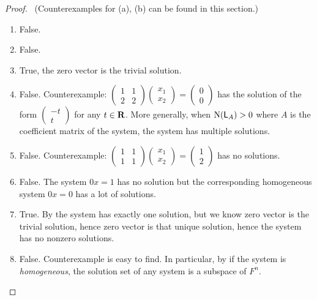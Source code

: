 \begin{proof} \ 
(Counterexamples for (a), (b) can be found in this section.)
\begin{enumerate}
\item False.
\item False.
\item True, the zero vector is the trivial solution.
\item False. Counterexample: \(\begin{pmatrix} 1 & 1 \\ 2 & 2 \end{pmatrix}\begin{pmatrix} x_1 \\ x_2 \end{pmatrix} = \begin{pmatrix} 0 \\ 0 \end{pmatrix}\) has the solution of the form \(\begin{pmatrix} -t \\ t \end{pmatrix}\) for any \(t \in \mathbf{R}\).
    More generally, when \(\mathrm{N}(\textsf{L}_A) > 0\) where \(A\) is the coefficient matrix of the system, the system has multiple solutions.
\item False. Counterexample: \(\begin{pmatrix} 1 & 1 \\ 1 & 1 \end{pmatrix}\begin{pmatrix} x_1 \\ x_2 \end{pmatrix} = \begin{pmatrix} 1 \\ 2 \end{pmatrix}\) has no solutions.
\item False. The system \(0x = 1\) has no solution but the corresponding homogeneous system \(0x = 0\) has a lot of solutions.
\item True. By \THM{3.10} the system has exactly one solution, but we know zero vector is the trivial solution, hence zero vector is that unique solution, hence the system has no nonzero solutions.
\item False. Counterexample is easy to find.
    In particular, by  if the system is \emph{homogeneous}, the solution set of any system is a subspace of \(F^n\).
\end{enumerate}
\end{proof}

